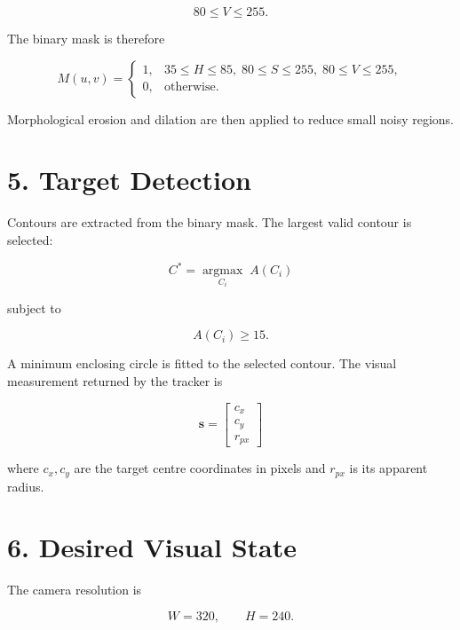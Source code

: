 \documentclass[12pt,a4paper]{article}
\begin{document}
\begin{equation}
80\leq V\leq255.
\end{equation}

The binary mask is therefore

\begin{equation}
\boxed{
M(u,v)=
\begin{cases}
1,&35\leq H\leq85,\;80\leq S\leq255,\;80\leq V\leq255,\\
0,&\text{otherwise}.
\end{cases}
}
\end{equation}

Morphological erosion and dilation are then applied to reduce small noisy regions.

\section{5. Target Detection}

Contours are extracted from the binary mask. The largest valid contour is selected:

\begin{equation}
\boxed{
C^*=\underset{C_i}{\operatorname{argmax}}\;A(C_i)
}
\end{equation}

subject to

\begin{equation}
A(C_i)\geq15.
\end{equation}

A minimum enclosing circle is fitted to the selected contour. The visual measurement returned by the tracker is

\begin{equation}
\boxed{
\mathbf{s}=
\begin{bmatrix}
c_x\\c_y\\r_{px}
\end{bmatrix}
}
\end{equation}

where $c_x,c_y$ are the target centre coordinates in pixels and $r_{px}$ is its apparent radius.

\section{6. Desired Visual State}

The camera resolution is

\begin{equation}
W=320,\qquad H=240.
\end{equation}
\end{document}
